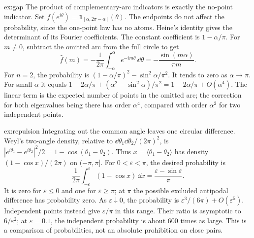 \begin{solution}{ex:gap}
\idea The product of complementary-arc indicators is exactly the no-point
indicator.
\writeup Set $f(e^{i\theta})=\mathbf1_{[\alpha,2\pi-\alpha]}(\theta)$.
The endpoints do not affect the probability, since the one-point law has
no atoms. Heine's identity gives the determinant of its Fourier coefficients.
The constant coefficient is $1-\alpha/\pi$.
For $m\ne0$, subtract the omitted arc from the full circle to get
\[
 \widehat f(m)=-\frac1{2\pi}\int_{-\alpha}^{\alpha}e^{-im\theta}\,\dd\theta
 =-\frac{\sin(m\alpha)}{\pi m}.
\]
For $n=2$, the probability is
$(1-\alpha/\pi)^2-\sin^2\alpha/\pi^2$.
It tends to zero as $\alpha\to\pi$.
For small $\alpha$ it equals
$1-2\alpha/\pi+(\alpha^2-\sin^2\alpha)/\pi^2
=1-2\alpha/\pi+O(\alpha^4)$.
The linear term is the expected number of points in the omitted arc;
the correction for both eigenvalues being there has order $\alpha^4$,
compared with order $\alpha^2$ for two independent points.
\end{solution}
\begin{solution}{ex:repulsion}
\idea Integrating out the common angle leaves one circular difference.
\writeup Weyl's two-angle density, relative to
$\dd\theta_1\dd\theta_2/(2\pi)^2$, is
$|e^{i\theta_1}-e^{i\theta_2}|^2/2=1-\cos(\theta_1-\theta_2)$.
Thus $x=\langle\theta_1-\theta_2\rangle$ has density
$(1-\cos x)/(2\pi)$ on $(-\pi,\pi]$.
For $0<\varepsilon<\pi$, the desired probability is
\[
 \frac1{2\pi}\int_{-\varepsilon}^{\varepsilon}(1-\cos x)\,\dd x
 =\frac{\varepsilon-\sin\varepsilon}{\pi}.
\]
It is zero for $\varepsilon\le0$ and one for $\varepsilon\ge\pi$;
at $\pi$ the possible excluded antipodal difference has probability zero.
As $\varepsilon\downarrow0$, the probability is
$\varepsilon^3/(6\pi)+O(\varepsilon^5)$.
Independent points instead give $\varepsilon/\pi$ in this range.
Their ratio is asymptotic to $6/\varepsilon^2$; at $\varepsilon=0.1$,
the independent probability is about $600$ times as large. This is a
comparison of probabilities, not an absolute prohibition on close pairs.
\end{solution}

